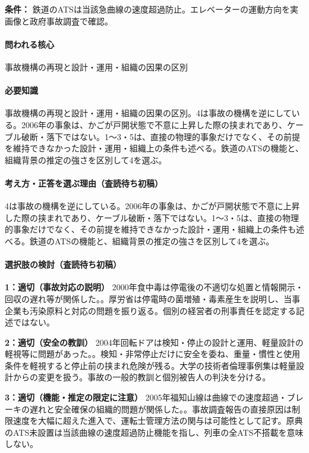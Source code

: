 \noindent\textbf{条件：} 鉄道のATSは当該急曲線の速度超過防止。エレベーターの運動方向を実画像と政府事故調査で確認。\par

\paragraph{問われる核心} 事故機構の再現と設計・運用・組織の因果の区別

\paragraph{必要知識} 事故機構の再現と設計・運用・組織の因果の区別。4は事故の機構を逆にしている。2006年の事象は、かごが戸開状態で不意に上昇した際の挟まれであり、ケーブル破断・落下ではない。1〜3・5は、直接の物理的事象だけでなく、その前提を維持できなかった設計・運用・組織上の条件も述べる。鉄道のATSの機能と、組織背景の推定の強さを区別して4を選ぶ。

\paragraph{考え方・正答を選ぶ理由（査読待ち初稿）} 4は事故の機構を逆にしている。2006年の事象は、かごが戸開状態で不意に上昇した際の挟まれであり、ケーブル破断・落下ではない。1〜3・5は、直接の物理的事象だけでなく、その前提を維持できなかった設計・運用・組織上の条件も述べる。鉄道のATSの機能と、組織背景の推定の強さを区別して4を選ぶ。

\paragraph{選択肢の検討（査読待ち初稿）}\mbox{}\par

\noindent\textbf{1：適切（事故対応の説明）} 2000年食中毒は停電後の不適切な処置と情報開示・回収の遅れ等が関係した。。厚労省は停電時の菌増殖・毒素産生を説明し、当事企業も汚染原料と対応の問題を振り返る。個別の経営者の刑事責任を認定する記述ではない。\par

\noindent\textbf{2：適切（安全の教訓）} 2004年回転ドアは検知・停止の設計と運用、軽量設計の軽視等に問題があった。。検知・非常停止だけに安全を委ね、重量・慣性と使用条件を軽視すると停止前の挟まれ危険が残る。大学の技術者倫理事例集は軽量設計からの変更を扱う。事故の一般的教訓と個別被告人の判決を分ける。\par

\noindent\textbf{3：適切（機能・推定の限定に注意）} 2005年福知山線は曲線での速度超過・ブレーキの遅れと安全確保の組織的問題が関係した。。事故調査報告の直接原因は制限速度を大幅に超えた進入で、運転士管理方法の関与は可能性として記す。原典のATS未設置は当該曲線の速度超過防止機能を指し、列車の全ATS不搭載を意味しない。\par

